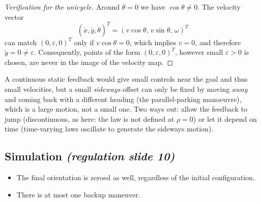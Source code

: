 \documentclass[11pt,a4paper]{article}
\theoremstyle{plain}
\theoremstyle{definition}
\theoremstyle{remark}
\begin{document}
\begin{proof}[Verification for the unicycle]
Around $\theta=0$ we have $\cos\theta\neq0$. The velocity vector
\[
(\dot x,\dot y,\dot\theta)^T = (v\cos\theta,\, v\sin\theta,\, \omega)^T
\]
can match $(0,\varepsilon,0)^T$ only if $v\cos\theta=0$, which implies $v=0$, and therefore $\dot y=0\ne\varepsilon$. Consequently, points of the form $(0,\varepsilon,0)^T$, however small $\varepsilon>0$ is chosen, are never in the image of the velocity map.
\end{proof}

\begin{intuition}
A continuous static feedback would give small controls near the goal and thus small velocities, but a small \emph{sideways} offset can only be fixed by moving \emph{away} and coming back with a different heading (the parallel-parking manoeuvre), which is a large motion, not a small one. Two ways out: allow the feedback to jump (discontinuous, as here: the law is not defined at $\rho=0$) or let it depend on time (time-varying laws oscillate to generate the sideways motion).
\end{intuition}

\subsection{Simulation \emph{(regulation slide 10)}}

\begin{itemize}[leftmargin=*,nosep]
\item The final orientation is zeroed as well, regardless of the initial configuration.
\item There is at most one backup maneuver.
\end{itemize}
\end{document}
